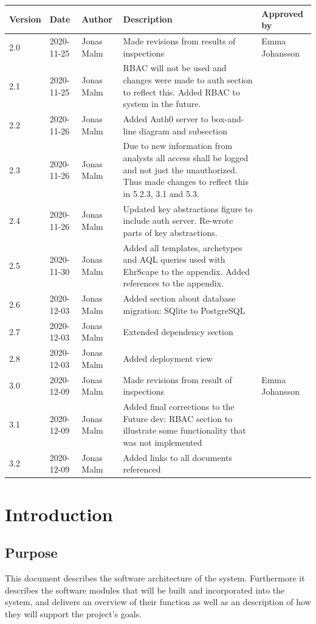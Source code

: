 \documentclass{article}
\begin{document}
\begin{table}
\centering
\begin{tabular}{|l|l|l|p{7cm}|p{3cm}|}
\hline
Version & Date & Author & Description & Approved by \\ \hline
2.0 & 2020-11-25 & Jonas Malm & Made revisions from results of inspections & Emma Johansson\\
2.1 & 2020-11-25 & Jonas Malm & RBAC will not be used and changes were made to auth section to reflect this. Added RBAC to system in the future. & \\
2.2 & 2020-11-26 & Jonas Malm & Added Auth0 server to box-and-line diagram and subsection & \\
2.3 & 2020-11-26 & Jonas Malm & Due to new information from analysts all access shall be logged and not just the unauthorized. Thus made changes to reflect this in 5.2.3, 3.1 and 5.3. & \\
2.4 & 2020-11-26 & Jonas Malm & Updated key abstractions figure to include auth server. Re-wrote parts of key abstractions. & \\
2.5 & 2020-11-30 & Jonas Malm & Added all templates, archetypes and AQL queries used with EhrScape to the appendix. Added references to the appendix. & \\
2.6 & 2020-12-03 & Jonas Malm & Added section about database migration: SQlite to PostgreSQL & \\
2.7 & 2020-12-03 & Jonas Malm & Extended dependency section & \\
2.8 & 2020-12-03 & Jonas Malm & Added deployment view & \\ \hline
3.0 & 2020-12-09 & Jonas Malm & Made revisions from result of inspections & Emma Johansson\\ 
3.1 & 2020-12-09 & Jonas Malm & Added final corrections to the Future dev: RBAC section to illustrate some functionality that was not implemented & \\
3.2 & 2020-12-09 & Jonas Malm & Added links to all documents referenced & \\
\hline
\end{tabular}
\end{table}

\restoregeometry
\clearpage

\tableofcontents
\clearpage

\section{Introduction}
\subsection{Purpose}
This document describes the software architecture of the system. Furthermore it describes the software modules that will be built and incorporated into the system, and delivers an overview of their function as well as an description of how they will support the project's goals.
\end{document}
